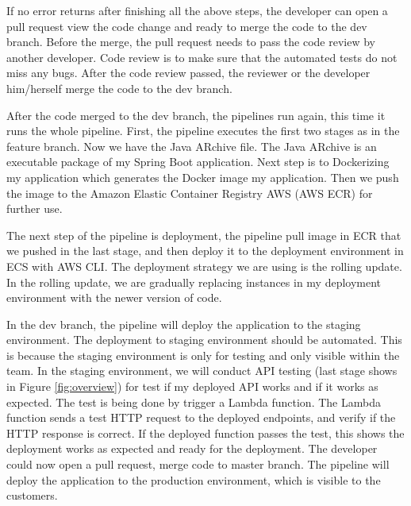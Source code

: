 If no error returns after finishing all the above steps, the developer can open a pull request view the code change and ready to merge the code to the dev branch. Before the merge, the pull request needs to pass the code review by another developer. Code review is to make sure that the automated tests do not miss any bugs. After the code review passed, the reviewer or the developer him/herself merge the code to the dev branch.  
\par
After the code merged to the dev branch, the pipelines run again, this time it runs the whole pipeline. First, the pipeline executes the first two stages as in the feature branch. Now we have the Java ARchive file. The Java ARchive is an executable package of my Spring Boot application. Next step is to Dockerizing my application which generates the Docker image my application. Then we push the image to the Amazon Elastic Container Registry AWS (AWS ECR) for further use.
\par
\label{deploy}
The next step of the pipeline is deployment, the pipeline pull image in ECR that we pushed in the last stage, and then deploy it to the deployment environment in ECS with AWS CLI. The deployment strategy we are using is the rolling update. In the rolling update, we are gradually replacing instances in my deployment environment with the newer version of code.
\par
In the dev branch, the pipeline will deploy the application to the staging environment. The deployment to staging environment should be automated. This is because the staging environment is only for testing and only visible within the team. 
In the staging environment, we will conduct API testing (last stage shows in Figure \ref{fig:overview}) for test if my deployed API works and if it works as expected. The test is being done by trigger a Lambda function. The Lambda function sends a test HTTP request to the deployed endpoints, and verify if the HTTP response is correct. If the deployed function passes the test, this shows the deployment works as expected and ready for the deployment. The developer could now open a pull request, merge code to master branch. The pipeline will deploy the application to the production environment, which is visible to the customers.
